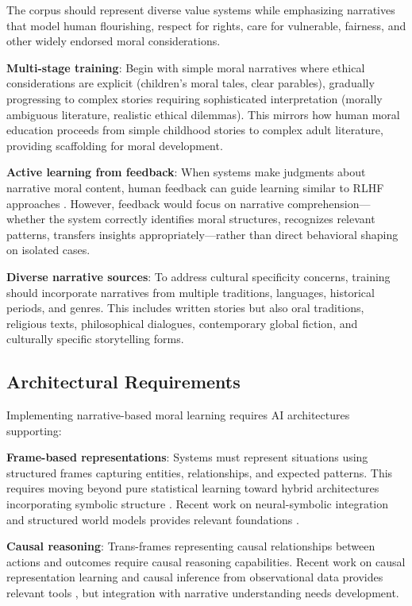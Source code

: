 \documentclass[12pt]{article}
\begin{document}
The corpus should represent diverse value systems while emphasizing narratives that model human flourishing, respect for rights, care for vulnerable, fairness, and other widely endorsed moral considerations.

\textbf{Multi-stage training}: Begin with simple moral narratives where ethical considerations are explicit (children's moral tales, clear parables), gradually progressing to complex stories requiring sophisticated interpretation (morally ambiguous literature, realistic ethical dilemmas). This mirrors how human moral education proceeds from simple childhood stories to complex adult literature, providing scaffolding for moral development.

\textbf{Active learning from feedback}: When systems make judgments about narrative moral content, human feedback can guide learning similar to RLHF approaches \citep{christiano2017deep}. However, feedback would focus on narrative comprehension---whether the system correctly identifies moral structures, recognizes relevant patterns, transfers insights appropriately---rather than direct behavioral shaping on isolated cases.

\textbf{Diverse narrative sources}: To address cultural specificity concerns, training should incorporate narratives from multiple traditions, languages, historical periods, and genres. This includes written stories but also oral traditions, religious texts, philosophical dialogues, contemporary global fiction, and culturally specific storytelling forms.

\subsection{Architectural Requirements}

Implementing narrative-based moral learning requires AI architectures supporting:

\textbf{Frame-based representations}: Systems must represent situations using structured frames capturing entities, relationships, and expected patterns. This requires moving beyond pure statistical learning toward hybrid architectures incorporating symbolic structure \citep{garcez2019neurosymbolic}. Recent work on neural-symbolic integration and structured world models provides relevant foundations \citep{scholkopf2021toward}.

\textbf{Causal reasoning}: Trans-frames representing causal relationships between actions and outcomes require causal reasoning capabilities. Recent work on causal representation learning and causal inference from observational data provides relevant tools \citep{scholkopf2021toward, pearl2009causality}, but integration with narrative understanding needs development.
\end{document}
